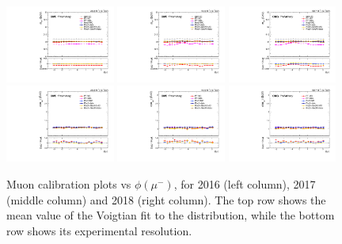 \begin{figure}[!htb]
      \centering
      \includegraphics[width=0.32\textwidth]{pics/muon_corr/muon_cal/2016/muN_phi_summary_mean.pdf}
      \includegraphics[width=0.32\textwidth]{pics/muon_corr/muon_cal/2017/muN_phi_summary_mean.pdf}
      \includegraphics[width=0.32\textwidth]{pics/muon_corr/muon_cal/2018/muN_phi_summary_mean.pdf}
      \includegraphics[width=0.32\textwidth]{pics/muon_corr/muon_cal/2016/muN_phi_summary_reso.pdf}
      \includegraphics[width=0.32\textwidth]{pics/muon_corr/muon_cal/2017/muN_phi_summary_reso.pdf}
      \includegraphics[width=0.32\textwidth]{pics/muon_corr/muon_cal/2018/muN_phi_summary_reso.pdf}
      \caption{Muon calibration plots vs $\phi(\mu^{-})$, for 2016 (left column), 2017 (middle column) and 2018 (right column).
               The top row shows the mean value of the Voigtian fit to the \mmm distribution, 
               while the bottom row shows its experimental resolution.}
      \label{fig:mucal_muN_phi}
\end{figure}


